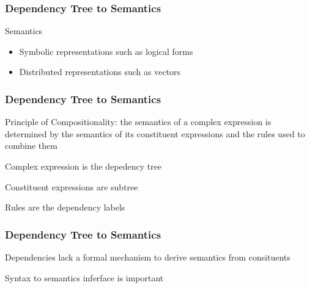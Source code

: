 \documentclass[mathserif,12pt]{beamer}
\newcommand{\hlight}[1]{{\color{blue!80} #1}}
\begin{document}
\begin{frame}
\frametitle{Dependency Tree to Semantics}
\large
  
\begin{block}{\center Semantics}
  \begin{itemize}
   \vspace{1em}
   \item Symbolic representations such as logical forms
   \vspace{1em}
   \item Distributed representations such as vectors
   \vspace{1em}
  \end{itemize}
\end{block}
\end{frame}

\begin{frame}
\frametitle{Dependency Tree to Semantics}
\large
  \hlight{Principle of Compositionality:} the semantics of a complex expression is determined by the semantics of its constituent expressions and the rules used to combine them
  
  \vspace{2em}
  \alert{Complex expression} is the depedency tree
  
  \vspace{2em}
  \alert{Constituent expressions} are subtree
  
  \vspace{2em}
  \alert{Rules} are the dependency labels
\end{frame}



\begin{frame}
\frametitle{Dependency Tree to Semantics}
\large
  Dependencies \alert{lack} a formal mechanism to derive semantics from consituents

\vspace{3em}
  
 Syntax to semantics inferface is important
\end{frame}
\end{document}
